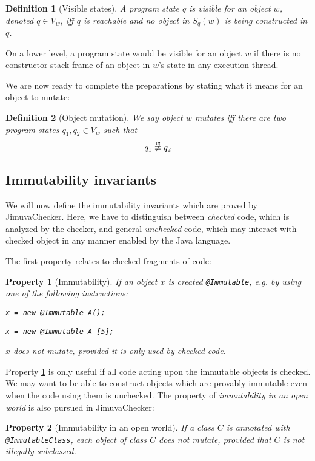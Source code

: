 \documentclass{pracamgr}
\theoremstyle{all}
\newtheorem{defi}{Definition}[chapter]
\newtheorem{invariant}{Property}
\begin{document}
\begin{defi}[Visible states]
  A program state $q$ is \emph{visible} for an object $w$, denoted $q
  \in V_w$, iff $q$ is reachable and no object in $S_q(w)$ is being
  constructed in $q$.
\end{defi}
On a lower level, a program state would be visible for an object $w$
if there is no constructor stack frame of an object in $w$'s state in
any execution thread.

We are now ready to complete the preparations by stating what it means
for an object to mutate:
\begin{defi}[Object mutation]
  We say object $w$ \emph{mutates} iff there are two program states
  $q_1, q_2 \in V_w$ such that
  $$q_1 \not\stackrel{w}{\equiv} q_2$$
\end{defi}

\subsection{Immutability invariants}

We will now define the immutability invariants which are proved by
JimuvaChecker. Here, we have to distinguish between \emph{checked}
code, which is analyzed by the checker, and general \emph{unchecked}
code, which may interact with checked object in any manner enabled by
the Java language.

The first property relates to checked fragments of code:
\begin{invariant}[Immutability] \label{inv:closed}
  If an object $x$ is created \texttt{@Immutable}, e.g. by using one of
  the following instructions:
  \begin{center}
    \texttt{x = new @Immutable A();}
  \end{center}
  \begin{center}
    \texttt{x = new @Immutable A [5];}
  \end{center}
  $x$ does not mutate, provided it is only used by checked code.
\end{invariant}

Property \ref{inv:closed} is only useful if all code acting upon the
immutable objects is checked. We may want to be able to construct
objects which are provably immutable even when the code using them is
unchecked. The property of \emph{immutability in an open world} is also
pursued in JimuvaChecker:
\begin{invariant}[Immutability in an open world]
  If a class $C$ is annotated with \texttt{@ImmutableClass}, each
  object of class $C$ does not mutate, provided that $C$ is not
  illegally subclassed.
\end{invariant}
\end{document}
